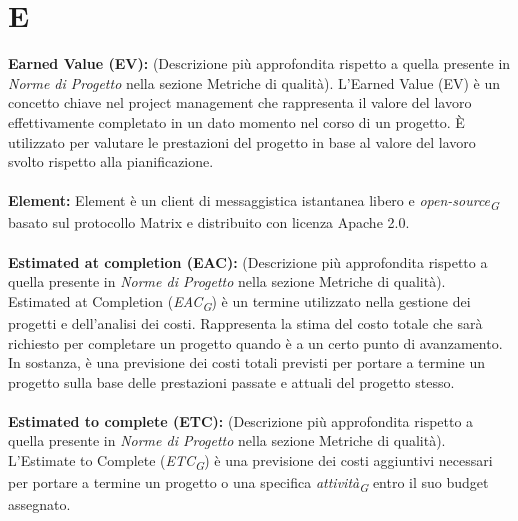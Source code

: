 \documentclass{article}
\begin{document}
\section*{E}
{}
\textbf{Earned Value (EV):} (Descrizione più approfondita rispetto a quella presente in \textit{Norme di Progetto} nella sezione Metriche di qualità). L'Earned Value (EV) è un concetto chiave nel project management che rappresenta il valore del lavoro effettivamente completato in un dato momento nel corso di un progetto. È utilizzato per valutare le prestazioni del progetto in base al valore del lavoro svolto rispetto alla pianificazione.
\\
\\
\textbf{Element:} Element è un client di messaggistica istantanea libero e \textit{open-source}\textsubscript{\textit{G}} basato sul protocollo Matrix e distribuito con licenza Apache 2.0.
\\
\\
\textbf{Estimated at completion (EAC):} (Descrizione più approfondita rispetto a quella presente in \textit{Norme di Progetto} nella sezione Metriche di qualità). Estimated at Completion (\textit{EAC}\textsubscript{\textit{G}}) è un termine utilizzato nella gestione dei progetti e dell'analisi dei costi. Rappresenta la stima del costo totale che sarà richiesto per completare un progetto quando è a un certo punto di avanzamento. In sostanza, è una previsione dei costi totali previsti per portare a termine un progetto sulla base delle prestazioni passate e attuali del progetto stesso.
\\
\\
\textbf{Estimated to complete (ETC):} (Descrizione più approfondita rispetto a quella presente in \textit{Norme di Progetto} nella sezione Metriche di qualità). L'Estimate to Complete (\textit{ETC}\textsubscript{\textit{G}}) è una previsione dei costi aggiuntivi necessari per portare a termine un progetto o una specifica \textit{attività}\textsubscript{\textit{G}} entro il suo budget assegnato.
\\
\pagebreak
\end{document}

